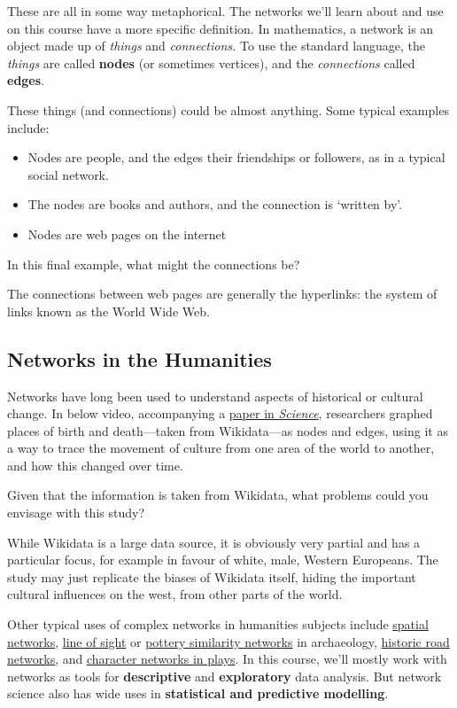 \documentclass[
]{book}
\begin{document}
These are all in some way metaphorical. The networks we'll learn about and use on this course have a more specific definition. In mathematics, a network is an object made up of \emph{things} and \emph{connections.} To use the standard language, the \emph{things} are called \textbf{nodes} (or sometimes vertices), and the \emph{connections} called \textbf{edges}.

These things (and connections) could be almost anything. Some typical examples include:

\begin{itemize}
\item
  Nodes are people, and the edges their friendships or followers, as in a typical social network.
\item
  The nodes are books and authors, and the connection is `written by'.
\item
  Nodes are web pages on the internet
\end{itemize}

In this final example, what might the connections be?

The connections between web pages are generally the hyperlinks: the system of links known as the World Wide Web.

\hypertarget{networks-in-the-humanities}{%
\subsection{Networks in the Humanities}\label{networks-in-the-humanities}}

Networks have long been used to understand aspects of historical or cultural change. In below video, accompanying a \href{https://www.science.org/doi/10.1126/science.1240064}{paper in \emph{Science}}, researchers graphed places of birth and death---taken from Wikidata---as nodes and edges, using it as a way to trace the movement of culture from one area of the world to another, and how this changed over time.

Given that the information is taken from Wikidata, what problems could you envisage with this study?

While Wikidata is a large data source, it is obviously very partial and has a particular focus, for example in favour of white, male, Western Europeans. The study may just replicate the biases of Wikidata itself, hiding the important cultural influences on the west, from other parts of the world.

Other typical uses of complex networks in humanities subjects include \href{https://model-articles.rrchnm.org/articles/midura/}{spatial networks}, \href{https://www.frontiersin.org/articles/10.3389/fdigh.2017.00017/full}{line of sight} or \href{https://academic.oup.com/book/40384/chapter-abstract/347130019?redirectedFrom=fulltext}{pottery similarity networks} in archaeology, \href{https://www.landesgeschichte.uni-goettingen.de/handelsstrassen/index.php}{historic road networks}, and \href{http://www.martingrandjean.ch/network-visualization-shakespeare/}{character networks in plays}. In this course, we'll mostly work with networks as tools for \textbf{descriptive} and \textbf{exploratory} data analysis. But network science also has wide uses in \textbf{statistical and predictive modelling}.
\end{document}
